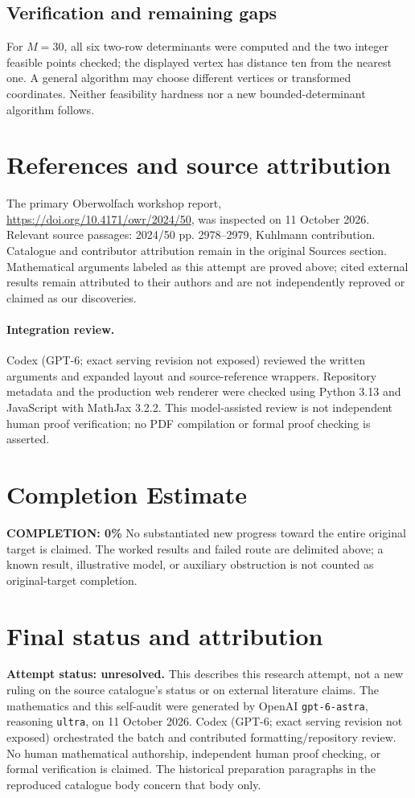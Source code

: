 \documentclass[11pt]{article}
\begin{document}
\subsection{Verification and remaining gaps}
For $M=30$, all six two-row determinants were computed and the two integer feasible points checked; the displayed vertex has distance ten from the nearest one. A general algorithm may choose different vertices or transformed coordinates. Neither feasibility hardness nor a new bounded-determinant algorithm follows.

\section{References and source attribution}
The primary Oberwolfach workshop report, \url{https://doi.org/10.4171/owr/2024/50}, was inspected on 11 October 2026. Relevant source passages: 2024/50 pp. 2978--2979, Kuhlmann contribution. Catalogue and contributor attribution remain in the original Sources section. Mathematical arguments labeled as this attempt are proved above; cited external results remain attributed to their authors and are not independently reproved or claimed as our discoveries.


\paragraph{Integration review.} Codex (GPT-6; exact serving revision not exposed) reviewed the written arguments and expanded layout and source-reference wrappers. Repository metadata and the production web renderer were checked using Python 3.13 and JavaScript with MathJax 3.2.2. This model-assisted review is not independent human proof verification; no PDF compilation or formal proof checking is asserted.

\section{Completion Estimate}
\noindent\textbf{COMPLETION: 0\%}
No substantiated new progress toward the entire original target is claimed. The worked results and failed route are delimited above; a known result, illustrative model, or auxiliary obstruction is not counted as original-target completion.

\section{Final status and attribution}
\textbf{Attempt status: unresolved.} This describes this research attempt, not a new ruling on the source catalogue's status or on external literature claims.
The mathematics and this self-audit were generated by OpenAI \texttt{gpt-6-astra}, reasoning \texttt{ultra}, on 11 October 2026. Codex (GPT-6; exact serving revision not exposed) orchestrated the batch and contributed formatting/repository review. No human mathematical authorship, independent human proof checking, or formal verification is claimed. The historical preparation paragraphs in the reproduced catalogue body concern that body only.
\end{document}
